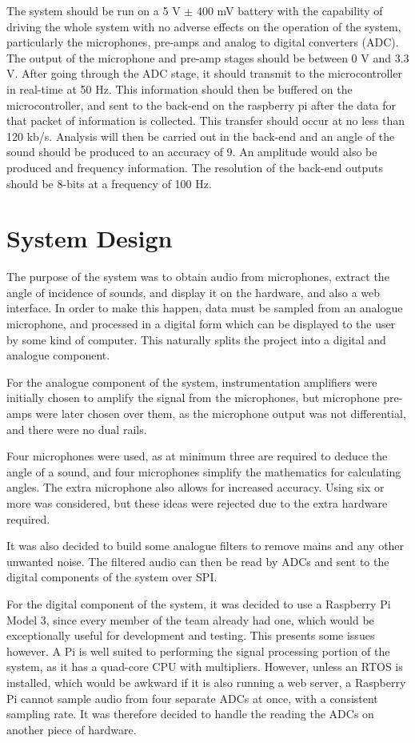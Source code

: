 \documentclass[a4paper]{article}
\begin{document}
The system should be run on a 5 V $\pm$ 400 mV battery with the capability of
driving the whole system with no adverse effects on the operation of the system,
particularly the microphones, pre-amps and analog to digital converters (ADC).
The output of the microphone and pre-amp stages should be between 0 V and 3.3 V.
After going through the ADC stage, it should transmit to the microcontroller in
real-time at 50 Hz. This information should then be buffered on the
microcontroller, and sent to the back-end on the raspberry pi after the data for
that packet of information is collected. This transfer should occur at no less
than 120 kb/s. Analysis will then be carried out in the back-end and an angle of
the sound should be produced to an accuracy of 9\textdegree. An amplitude would also be
produced and frequency information. The resolution of the back-end outputs
should be 8-bits at a frequency of 100 Hz.


\section{System Design}

The purpose of the system was to obtain audio from microphones, extract the
angle of incidence of sounds, and display it on the hardware, and also a web
interface. In order to make this happen, data must be sampled from an analogue
microphone, and processed in a digital form which can be displayed to the user
by some kind of computer. This naturally splits the project into a digital and
analogue component.

For the analogue component of the system, instrumentation amplifiers were
initially chosen to amplify the signal from the microphones, but microphone
pre-amps were later chosen over them, as the microphone output was not
differential, and there were no dual rails.

Four microphones were used, as at minimum three are required to deduce the angle
of a sound, and four microphones simplify the mathematics for calculating
angles. The extra microphone also allows for increased accuracy. Using six or
more was considered, but these ideas were rejected due to the extra hardware
required.

It was also decided to build some analogue filters to remove mains and any other
unwanted noise.  The filtered audio can then be read by ADCs and sent to the
digital components of the system over SPI.

For the digital component of the system, it was decided to use a Raspberry Pi
Model 3, since every member of the team already had one, which would be
exceptionally useful for development and testing. This presents some issues
however. A Pi is well suited to performing the signal processing portion of the
system, as it has a quad-core CPU with multipliers.  However, unless an RTOS is
installed, which would be awkward if it is also running a web server, a
Raspberry Pi cannot sample audio from four separate ADCs at once, with a
consistent sampling rate. It was therefore decided to handle the reading the
ADCs on another piece of hardware.
\end{document}
